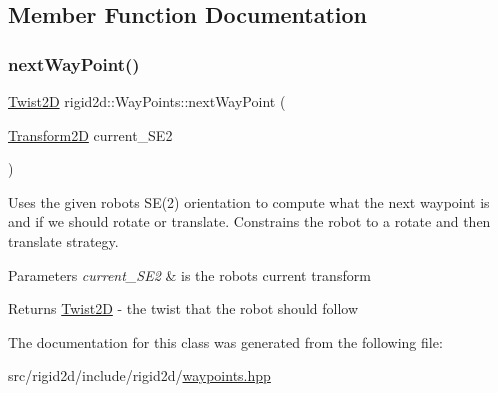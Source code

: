 \subsection{Member Function Documentation}
\mbox{\label{classrigid2d_1_1WayPoints_ab196e9fa96a7de086586e787b99af600}} 
\subsubsection{\texorpdfstring{next\+Way\+Point()}{nextWayPoint()}}
{\footnotesize\ttfamily \hyperlink{classrigid2d_1_1Twist2D}{Twist2D} rigid2d\+::\+Way\+Points\+::next\+Way\+Point (\begin{DoxyParamCaption}\item[{\hyperlink{classrigid2d_1_1Transform2D}{Transform2D}}]{current\+\_\+\+S\+E2 }\end{DoxyParamCaption})}



Uses the given robot\textquotesingle{}s S\+E(2) orientation to compute what the next waypoint is and if we should rotate or translate. Constrains the robot to a rotate and then translate strategy. 


\begin{DoxyParams}{Parameters}
{\em current\+\_\+\+S\+E2} & is the robot\textquotesingle{}s current transform \\
\hline
\end{DoxyParams}
\begin{DoxyReturn}{Returns}
\hyperlink{classrigid2d_1_1Twist2D}{Twist2D} -\/ the twist that the robot should follow 
\end{DoxyReturn}


The documentation for this class was generated from the following file\+:\begin{DoxyCompactItemize}
\item 
src/rigid2d/include/rigid2d/\hyperlink{waypoints_8hpp}{waypoints.\+hpp}\end{DoxyCompactItemize}
